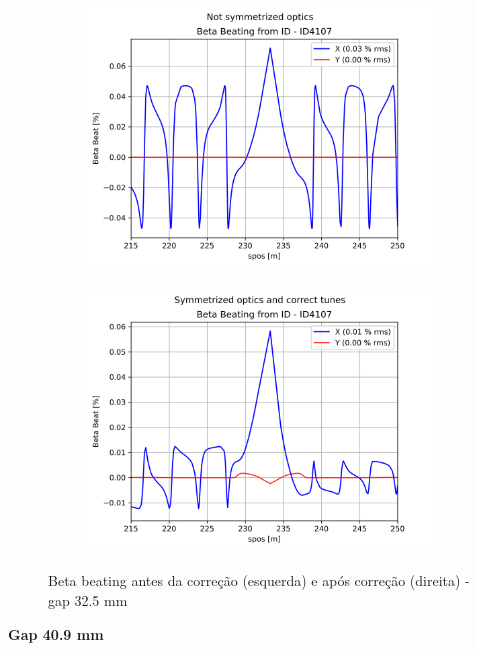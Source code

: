 \documentclass[a4paper,12pt]{article}
\begin{document}
\begin{figure}[H]
\begin{subfigure}{0.5\textwidth}
\includegraphics[width=0.9\linewidth, height=7cm]{figs/phase25 gap32 uncorrected-optics.png} 
\label{fig:subim12532}
\end{subfigure}
\begin{subfigure}{0.5\textwidth}
\includegraphics[width=0.9\linewidth, height=7cm]{figs/phase25 gap32 corrected-optics-tunes.png}
\label{fig:subim22532}
\end{subfigure}
\caption{Beta beating antes da correção (esquerda) e após correção (direita) - gap 32.5 mm}
\label{fig:bb25_32}
\end{figure}

\textbf{Gap 40.9 mm} \\
\end{document}
